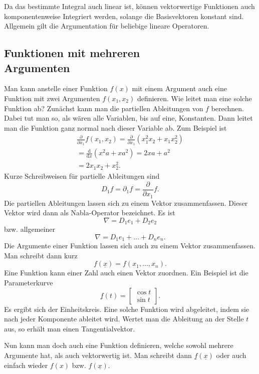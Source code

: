 \documentclass[a4paper,10pt,fleqn,twocolumn,twoside]{article}
\begin{document}
Da das bestimmte Integral auch linear ist, können vektorwertige
Funktionen auch komponentenweise Integriert werden, solange die
Basisvektoren konstant sind. Allgemein gilt die Argumentation für
beliebige lineare Operatoren.


\subsection[Funktionen mit mehreren Argumenten]
{Funktionen mit mehreren\\
Argumenten}

Man kann anstelle einer Funktion $f(x)$ mit einem Argument auch
eine Funktion mit zwei Argumenten $f(x_1,x_2)$ definieren. Wie
leitet man eine solche Funktion ab? Zunächst kann man die partiellen
Ableitungen von $f$ berechnen. Dabei tut man so, als wären alle
Variablen, bis auf eine, Konstanten. Dann leitet man die Funktion ganz
normal nach dieser Variable ab. Zum Beispiel ist
\begin{gather*}
\frac{\partial}{\partial x_1}f(x_1,x_2)
= \frac{\partial}{\partial x_1} (x_1^2x_2+x_1x_2^2)\\
= \frac{\mathrm d}{\mathrm dx} (x^2a+xa^2) = 2xa+a^2\\
= 2x_1x_2+x_2^2.
\end{gather*}
\noindent
Kurze Schreibweisen für partielle Ableitungen sind
\[D_1f = \partial_1f = \frac{\partial}{\partial x_1}f.\]
\noindent
Die partiellen Ableitungen lassen sich zu einem Vektor zusammenfassen.
Dieser Vektor wird dann als Nabla-Operator bezeichnet. Es ist
\[\nabla = D_1e_1+D_2e_2\]
\noindent
bzw. allgemeiner
\[\nabla = D_1e_1+\dots+D_ne_n.\]
\noindent
Die Argumente einer Funktion lassen sich auch zu einem Vektor
zusammenfassen. Man schreibt dann kurz
\[f(\underline x) = f(x_1,\dots,x_n).\]
\noindent
Eine Funktion kann einer Zahl auch einen Vektor zuordnen.
Ein Beispiel ist die Parameterkurve
\[\underline f(t) = \begin{bmatrix}\cos t\\ \sin t\end{bmatrix}.\]
\noindent
Es ergibt sich der Einheitskreis. Eine solche Funktion wird
abgeleitet, indem sie nach jeder Komponente ableitet wird.
Wertet man die Ableitung an der Stelle $t$ aus, so erhält man
einen Tangentialvektor.

Nun kann man doch auch eine Funktion definieren, welche sowohl
mehrere Argumente hat, als auch vektorwertig ist. Man schreibt dann
$\underline f(\underline x)$ oder auch einfach wieder
$f(x)$ bzw. $f(\underline x)$.
\end{document}
